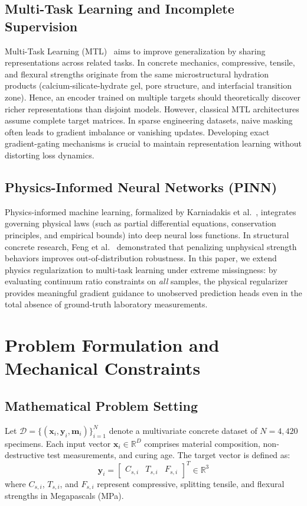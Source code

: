 \documentclass[conference]{IEEEtran}
\begin{document}
\subsection{Multi-Task Learning and Incomplete Supervision}
Multi-Task Learning (MTL)~\cite{caruana1997multitask} aims to improve generalization by sharing representations across related tasks. In concrete mechanics, compressive, tensile, and flexural strengths originate from the same microstructural hydration products (calcium-silicate-hydrate gel, pore structure, and interfacial transition zone). Hence, an encoder trained on multiple targets should theoretically discover richer representations than disjoint models. However, classical MTL architectures assume complete target matrices. In sparse engineering datasets, naive masking often leads to gradient imbalance or vanishing updates. Developing exact gradient-gating mechanisms is crucial to maintain representation learning without distorting loss dynamics.

\subsection{Physics-Informed Neural Networks (PINN)}
Physics-informed machine learning, formalized by Karniadakis et al.~\cite{karniadakis2021physics}, integrates governing physical laws (such as partial differential equations, conservation principles, and empirical bounds) into deep neural loss functions. In structural concrete research, Feng et al.~\cite{feng2021machine} demonstrated that penalizing unphysical strength behaviors improves out-of-distribution robustness. In this paper, we extend physics regularization to multi-task learning under extreme missingness: by evaluating continuum ratio constraints on \textit{all} samples, the physical regularizer provides meaningful gradient guidance to unobserved prediction heads even in the total absence of ground-truth laboratory measurements.

\section{Problem Formulation and Mechanical Constraints}

\subsection{Mathematical Problem Setting}
Let $\mathcal{D} = \{(\mathbf{x}_i, \mathbf{y}_i, \mathbf{m}_i)\}_{i=1}^N$ denote a multivariate concrete dataset of $N = 4,420$ specimens.
Each input vector $\mathbf{x}_i \in \mathbb{R}^D$ comprises material composition, non-destructive test measurements, and curing age.
The target vector is defined as:
\begin{equation}
    \mathbf{y}_i = \begin{bmatrix} C_{s,i} & T_{s,i} & F_{s,i} \end{bmatrix}^T \in \mathbb{R}^3
\end{equation}
where $C_{s,i}$, $T_{s,i}$, and $F_{s,i}$ represent compressive, splitting tensile, and flexural strengths in Megapascals (MPa).
\end{document}
